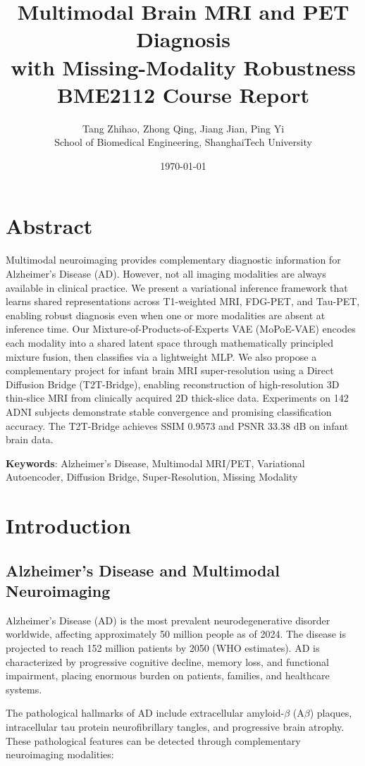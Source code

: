 \documentclass[11pt,a4paper]{article}
\title{Multimodal Brain MRI and PET Diagnosis\\with Missing-Modality Robustness\\[0.5em]{\large BME2112 Course Report}}
\author{Tang Zhihao, Zhong Qing, Jiang Jian, Ping Yi\\School of Biomedical Engineering, ShanghaiTech University}
\date{\today}
\begin{document}
\maketitle
\thispagestyle{empty}
\newpage
\tableofcontents
\newpage

\section{Abstract}
Multimodal neuroimaging provides complementary diagnostic information for Alzheimer's Disease (AD). However, not all imaging modalities are always available in clinical practice. We present a variational inference framework that learns shared representations across T1-weighted MRI, FDG-PET, and Tau-PET, enabling robust diagnosis even when one or more modalities are absent at inference time. Our Mixture-of-Products-of-Experts VAE (MoPoE-VAE) encodes each modality into a shared latent space through mathematically principled mixture fusion, then classifies via a lightweight MLP. We also propose a complementary project for infant brain MRI super-resolution using a Direct Diffusion Bridge (T2T-Bridge), enabling reconstruction of high-resolution 3D thin-slice MRI from clinically acquired 2D thick-slice data. Experiments on 142 ADNI subjects demonstrate stable convergence and promising classification accuracy. The T2T-Bridge achieves SSIM 0.9573 and PSNR 33.38 dB on infant brain data.

\textbf{Keywords}: Alzheimer's Disease, Multimodal MRI/PET, Variational Autoencoder, Diffusion Bridge, Super-Resolution, Missing Modality

\section{Introduction}

\subsection{Alzheimer's Disease and Multimodal Neuroimaging}
Alzheimer's Disease (AD) is the most prevalent neurodegenerative disorder worldwide, affecting approximately 50 million people as of 2024. The disease is projected to reach 152 million patients by 2050 (WHO estimates). AD is characterized by progressive cognitive decline, memory loss, and functional impairment, placing enormous burden on patients, families, and healthcare systems.

The pathological hallmarks of AD include extracellular amyloid-$\beta$ (A$\beta$) plaques, intracellular tau protein neurofibrillary tangles, and progressive brain atrophy. These pathological features can be detected through complementary neuroimaging modalities:
\end{document}
